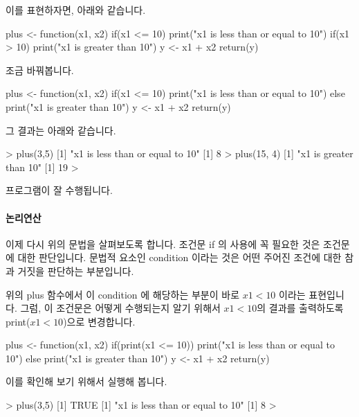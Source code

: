 이를 표현하자면, 아래와 같습니다. 

\begin{Schunk}
\begin{Soutput}
plus <- function(x1, x2){
	if(x1 <= 10) print("x1 is less than or equal to 10")
	if(x1 > 10) print("x1 is greater than 10")
	y <- x1 + x2
	return(y)
}
\end{Soutput}
\end{Schunk}

조금 바꿔봅니다. 

\begin{Schunk}
\begin{Soutput}
plus <- function(x1, x2){
	if(x1 <= 10) print("x1 is less than or equal to 10")
	else print("x1 is greater than 10")
	y <- x1 + x2
	return(y)
}
\end{Soutput}
\end{Schunk}

그 결과는 아래와 같습니다. 

\begin{Schunk}
\begin{Soutput}
> plus(3,5)
[1] "x1 is less than or equal to 10"
[1] 8
> plus(15, 4)
[1] "x1 is greater than 10"
[1] 19
> 
\end{Soutput}
\end{Schunk}

프로그램이 잘 수행됩니다. 

\paragraph{논리연산}
이제 다시 위의 문법을 살펴보도록 합니다. 
조건문 if 의 사용에 꼭 필요한 것은 조건문에 대한 판단입니다.
문법적 요소인  condition 이라는 것은 어떤 주어진 조건에 대한 참과 거짓을 판단하는 부분입니다.

위의 plus 함수에서 이 condition 에 해당하는 부분이 바로 $x1 < 10$ 이라는 표현입니다. 
그럼, 이 조건문은 어떻게 수행되는지 알기 위해서 $x1 < 10$의 결과를 출력하도록 print($x1<10$)으로 변경합니다.
 
\begin{Schunk}
\begin{Soutput}
plus <- function(x1, x2){
	if(print(x1 <= 10)) print("x1 is less than or equal to 10")
	else print("x1 is greater than 10")
	y <- x1 + x2
	return(y)
}
\end{Soutput}
\end{Schunk}

이를 확인해 보기 위해서 실행해 봅니다. 
\begin{Schunk}
\begin{Soutput}
> plus(3,5)
[1] TRUE
[1] "x1 is less than or equal to 10"
[1] 8
> 
\end{Soutput}
\end{Schunk}

